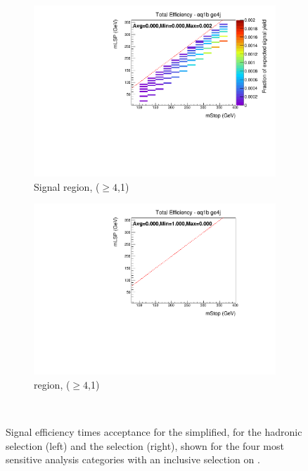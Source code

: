 \begin{figure}[ht!]
\begin{subfigure}[b]{0.47\textwidth}
    \includegraphics[width=\textwidth]{Figs/sms/t2cc/v24/T2cc_v24_had_eff_maps_eq1b_ge4j_SITV.pdf}
    \caption{Signal region, ($\geq 4$,1)}
    \label{fig:t2cc_sig_eff_ge4j_1b}
  \end{subfigure}
  \begin{subfigure}[b]{0.47\textwidth}
    \includegraphics[width=\textwidth]{Figs/sms/t2cc/v24/T2cc_v24_muon_eff_maps_eq1b_ge4j_SITV.pdf}
    \caption{\mj region, ($\geq 4$,1)}
    \label{fig:t2cc_mu_eff_ge4j_1b}
  \end{subfigure} \\
  \caption{Signal efficiency times acceptance for the \Ttwocc simplified, for 
  the hadronic selection (left) and the \mj selection (right), shown for the 
  four most sensitive analysis categories with an inclusive selection on \HT.}
  \label{fig:t2cc_eff}
\end{figure}

